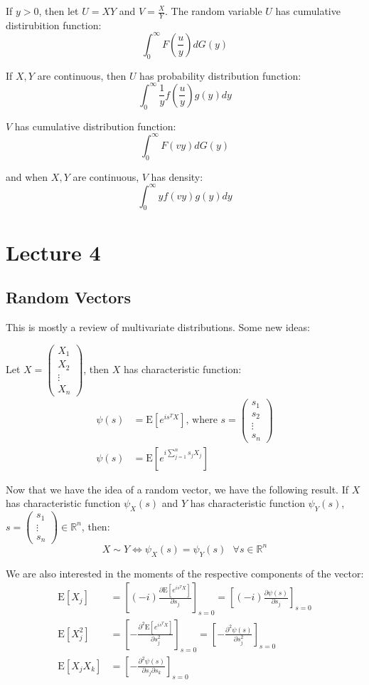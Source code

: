 \documentclass[english,12pt]{article}
\theoremstyle{plain}
\theoremstyle{definition}
\theoremstyle{definition} %
\newcommand{\R}{\mathbb{R}} %
\newcommand{\ex}[1]{\mbox{E} \left[ #1 \right]}
\begin{document}
If $y>0$, then let $U=XY$ and $V=\frac{X}{Y}$.  The random variable $U$ has cumulative distirubition function:
\[\int_0^\infty F\left(\frac{u}{y}\right)dG(y)\]

If $X,Y$ are continuous, then $U$ has probability distribution function:
\[\int_0^\infty\frac{1}{y}f\left(\frac{u}{y}\right)g(y)dy\]

$V$ has cumulative distribution function:
\[\int_0^\infty F(vy)dG(y)\]

and when $X,Y$ are continuous, $V$ has density:
\[\int_0^\infty yf(vy)g(y)dy\]

\section*{Lecture 4}
\subsection{Random Vectors}
This is mostly a review of multivariate distributions.  Some new ideas:

Let $X=
\begin{pmatrix}
X_1\\
X_2\\
\vdots\\
X_n
\end{pmatrix}$, then $X$ has characteristic function:
\begin{align*}
\psi(s)&=\ex{e^{is^TX}}\text{, where }
s=\begin{pmatrix}
s_1\\
s_2\\
\vdots\\
s_n
\end{pmatrix}\\
\psi(s)&=\ex{e^{i\sum\limits_{j=1}^ns_jX_j}}
\end{align*}

Now that we have the idea of a random vector, we have the following result.  If $X$ has characteristic function $\psi_X(s)$ and $Y$ has characteristic function $\psi_Y(s)$, $s=\begin{pmatrix}
s_1\\
\vdots\\
s_n
\end{pmatrix}\in\R^n$, then:
\[X\sim Y \iff \psi_X(s)=\psi_Y(s)\text{ }\forall s\in\R^n\]

We are also interested in the moments of the respective components of the vector:
\begin{align*}
\ex{X_j}&=\left[(-i)\frac{\partial\ex{e^{is^TX}}}{\partial s_j}\right]_{s=0}
=\left[(-i)\frac{\partial\psi(s)}{\partial s_j}\right]_{s=0}\\
\ex{X_j^2}&=\left[-\frac{\partial^2\ex{e^{is^TX}}}{\partial s_j^2}\right]_{s=0}
=\left[-\frac{\partial^2\psi(s)}{\partial s_j^2}\right]_{s=0}\\
\ex{X_jX_k}&=\left[-\frac{\partial^2\psi(s)}{\partial s_j\partial s_k}\right]_{s=0}
\end{align*}
\end{document}
